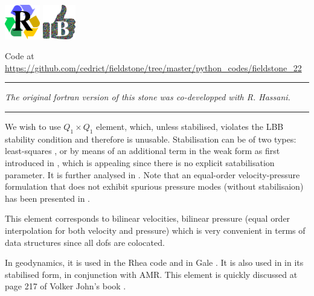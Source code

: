 
\includegraphics[height=1.5cm]{images/pictograms/replication}
\includegraphics[height=1.5cm]{images/pictograms/benchmark}



\begin{center}
Code at \url{https://github.com/cedrict/fieldstone/tree/master/python_codes/fieldstone_22}
\end{center}

\par\noindent\rule{\textwidth}{0.4pt}

{\sl The original fortran version of this stone was co-developped with R. Hassani.}

\par\noindent\rule{\textwidth}{0.4pt}

We wish to use $Q_1 \times Q_1$ element, which, unless stabilised,
violates  the LBB stability condition and therefore is unusable. 
Stabilisation can be of two types: least-squares \cite{dohu03,temr92,kibr12,gubl07},
or by means of an additional term in the weak form as first introduced in \cite{dobo04,bodg06}, 
which is appealing since there is no explicit satabilisation parameter.
It is further analysed in \cite{nosi01,lihc09,hufb86,shry78,grcc95}.
Note that an equal-order velocity-pressure formulation that does not exhibit spurious
pressure modes (without stabilisaion) has been presented in \cite{risc86}.

This element corresponds to bilinear velocities, bilinear pressure 
(equal order interpolation for both velocity and pressure) which is 
very convenient in terms of data structures since all dofs are colocated.

In geodynamics, it is used in the Rhea code \cite{stgb10,busa13} and in Gale \cite{arbi13}.
It is also used in \cite{lezh11} in its stabilised form, in conjunction with AMR. 
This element is quickly discussed at page 217 of Volker John's book \cite{john16}.


